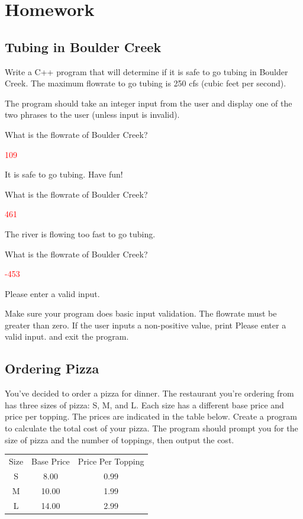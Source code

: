\section{Homework}
\subsection{Tubing in Boulder Creek}
Write a C++ program that will determine if it is safe to go tubing in Boulder Creek. The maximum flowrate to go tubing is 250 cfs (cubic feet per second).

The program should take an integer input from the user and display one of the two phrases to the user (unless input is invalid).

\begin{sample}
What is the flowrate of Boulder Creek?

\textcolor{red}{109}

It is safe to go tubing. Have fun!
\end{sample}

\begin{sample}
What is the flowrate of Boulder Creek?

\textcolor{red}{461}

The river is flowing too fast to go tubing.
\end{sample}

\begin{sample}
What is the flowrate of Boulder Creek?

\textcolor{red}{-453}

Please enter a valid input.
\end{sample}

Make sure your program does basic input validation. The flowrate must be greater than zero. If the user inputs a non-positive value, print Please enter a valid input. and exit the program.

\subsection{Ordering Pizza}
You've decided to order a pizza for dinner. The restaurant you're ordering from has three sizes of pizza: S, M, and L. Each size has a different base price and price per topping. The prices are indicated in the table below. Create a program to calculate the total cost of your pizza. The program should prompt you for the size of pizza and the number of toppings, then output the cost.

\begin{table}[H]
    \centering
    \begin{tabular}{c|c|c}
        Size & Base Price & Price Per Topping \\
        S & 8.00 & 0.99 \\
        M & 10.00 & 1.99 \\
        L & 14.00 & 2.99
    \end{tabular}
\end{table}

